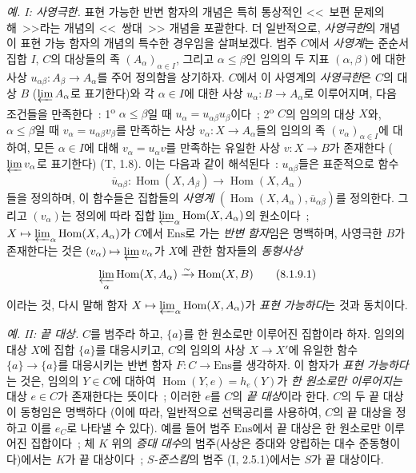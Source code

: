 \begin{env}[8.1.9]
\label{0.8.1.9-fr}
\textit{예. I: 사영극한.} 표현 가능한 반변 함자의 개념은 특히
통상적인 <<~보편 문제의
해~>>라는 개념의 <<~쌍대~>> 개념을 포괄한다. 더 일반적으로,
\emph{사영극한}의 개념이 표현 가능 함자의 개념의 특수한 경우임을
살펴보겠다. 범주 $C$에서 \emph{사영계}는 준순서 집합 $I$, $C$의
대상들의 족 $(A_\alpha)_{\alpha\in I}$, 그리고
$\alpha\leq\beta$인 임의의 두 지표 $(\alpha,\beta)$에 대한 사상
$u_{\alpha\beta}:A_\beta\to A_\alpha$를 주어 정의함을 상기하자.
$C$에서 이 사영계의 \emph{사영극한}은 $C$의 대상 $B$
($\varprojlim A_\alpha$로 표기한다)와 각 $\alpha\in I$에 대한 사상
$u_\alpha:B\to A_\alpha$로 이루어지며, 다음 조건들을 만족한다~:
1\textsuperscript{o} $\alpha\leq\beta$일 때
$u_\alpha=u_{\alpha\beta}u_\beta$이다~;
2\textsuperscript{o} $C$의 임의의 대상 $X$와, $\alpha\leq\beta$일 때
$v_\alpha=u_{\alpha\beta}v_\beta$를 만족하는 사상
$v_\alpha:X\to A_\alpha$들의 임의의 족 $(v_\alpha)_{\alpha\in I}$에
대하여, 모든 $\alpha\in I$에 대해 $v_\alpha=u_\alpha v$를 만족하는
유일한 사상 $v:X\to B$가 존재한다 ($\varprojlim v_\alpha$로 표기한다)
(T, 1.8). 이는 다음과 같이 해석된다~: $u_{\alpha\beta}$들은 표준적으로
함수
\[
  \overline{u}_{\alpha\beta}:\operatorname{Hom}(X,A_\beta)
  \to\operatorname{Hom}(X,A_\alpha)
\]
들을 정의하며, 이 함수들은 집합들의 \emph{사영계}
$(\operatorname{Hom}(X,A_\alpha),\overline{u}_{\alpha\beta})$를
정의한다. 그리고 $(v_\alpha)$는 정의에 따라 집합
$\varprojlim_\alpha\operatorname{Hom}(X,A_\alpha)$의 원소이다~;
$X\mapsto\varprojlim_\alpha\operatorname{Hom}(X,A_\alpha)$가 $C$에서
$\mathrm{Ens}$로 가는 \emph{반변 함자}임은 명백하며, 사영극한 $B$가
존재한다는 것은 $(v_\alpha)\mapsto\varprojlim v_\alpha$가 $X$에 관한
함자들의 \emph{동형사상}
\[
  \varprojlim_\alpha\operatorname{Hom}(X,A_\alpha)
  \xrightarrow{\sim}\operatorname{Hom}(X,B)
  \tag{8.1.9.1}
\]
이라는 것, 다시 말해 함자
$X\mapsto\varprojlim_\alpha\operatorname{Hom}(X,A_\alpha)$가
\emph{표현 가능하다}는 것과 동치이다.
\end{env}

\begin{env}[8.1.10]
\label{0.8.1.10-fr}
\textit{예. II: 끝 대상.} $C$를 범주라 하고, $\{a\}$를 한 원소로만
이루어진 집합이라 하자. 임의의 대상 $X$에 집합 $\{a\}$를 대응시키고,
$C$의 임의의 사상 $X\to X'$에 유일한 함수 $\{a\}\to\{a\}$를
대응시키는 반변 함자 $F:C\to\mathrm{Ens}$를 생각하자. 이 함자가
\emph{표현 가능하다}는 것은, 임의의 $Y\in C$에 대하여
$\operatorname{Hom}(Y,e)=h_e(Y)$가 \emph{한 원소로만 이루어지는} 대상
$e\in C$가 존재한다는 뜻이다~; 이러한 $e$를 $C$의 \emph{끝 대상}이라
한다. $C$의 두 끝 대상이 동형임은 명백하다 (이에 따라, 일반적으로
선택공리를 사용하여, $C$의 끝 대상을 정하고 이를 $e_C$로 나타낼 수
있다). 예를 들어 범주 $\mathrm{Ens}$에서 끝 대상은 한 원소로만
이루어진 집합이다~; 체 $K$ 위의 \emph{증대 대수}의 범주(사상은
증대와 양립하는 대수 준동형이다)에서는 $K$가 끝 대상이다~;
\emph{$S$-준스킴}의 범주 (I, 2.5.1)에서는 $S$가 끝 대상이다.
\end{env}

